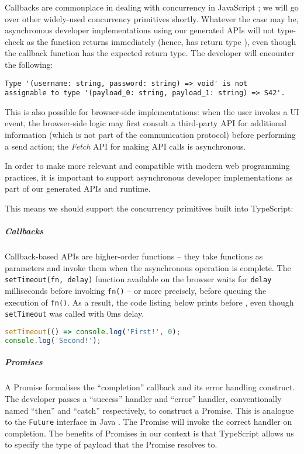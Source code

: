 Callbacks are commonplace in dealing with concurrency in JavaScript
\cite{CallbackHell}; we will go over other widely-used
concurrency primitives shortly.
Whatever the case may be, asynchronous developer implementations
using our generated APIs will not type-check as the function
returns immediately (hence, has return type ),
even though the callback function has the expected return type.
The developer will encounter the following:

\begin{lstlisting}[tabsize=2,numbers=none]
Type '(username: string, password: string) => void' is not 
assignable to type '(payload_0: string, payload_1: string) => S42'.
\end{lstlisting}

This is also possible for browser-side implementations:
when the user invokes a UI event, the browser-side logic
may first consult a third-party API for additional information
(which is not part of the communication protocol)
before performing a send action; the \textit{Fetch} API \cite{Fetch}
for making API calls is asynchronous.

In order to make  more relevant and compatible
with modern web programming practices, it is important to
support asynchronous developer implementations as part of our
generated APIs and runtime. 

This means we should support
the concurrency primitives built into TypeScript:

\subparagraph{Callbacks}
Callback-based APIs are higher-order functions -- they take functions
as parameters and invoke them when the asynchronous operation is complete.
The \texttt{setTimeout(fn, delay)} function available on the browser
waits for \texttt{delay} milliseconds before invoking \texttt{fn()} --
or more precisely, before queuing the execution of \texttt{fn()}.
As a result, the code listing below prints 
before , even though \texttt{setTimeout}
was called with 0ms delay.

\begin{lstlisting}[language=javascript,numbers=none]
setTimeout(() => console.log('First!', 0);
console.log('Second!');
\end{lstlisting}

\subparagraph{Promises}
A Promise formalises the ``completion'' callback
and its error handling construct. The developer passes a ``success''
handler and ``error'' handler, conventionally named
``then'' and ``catch'' respectively, to construct a Promise.
This is analogue to the \texttt{Future} interface in Java \cite{JavaFuture}.
The Promise will invoke the correct handler on completion.
The benefits of Promises in our context is that TypeScript allows
us to specify the type of payload that the Promise resolves to.


